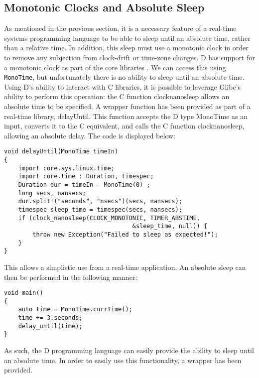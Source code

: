 \subsection{Monotonic Clocks and Absolute Sleep}
As mentioned in the previous section, it is a necessary feature of a real-time 
systems programming language to be able to sleep until an absolute time, rather 
than a relative time. In addition, this sleep must use a monotonic clock in order 
to remove any subjection from clock-drift or time-zone changes. D has support 
for a monotonic clock as part of the core libraries 
\cite{dlang-core-time}. We can access this using 
\texttt{MonoTime}, but unfortunately there is no ability to sleep until an 
absolute time. Using D's ability to interact with C libraries, it is possible 
to leverage Glibc's ability to perform this operation: the C function 
clock\textunderscore{}nanosleep allows an absolute time to be specified.
\cite{clock-nanosleep}
A wrapper function has been provided as part of a real-time library, delayUntil. 
This function accepts the D type MonoTime as an input, converts it to the C 
equivalent, and calls the C function clock\textunderscore{}nanosleep, allowing an absolute delay.
The code is displayed below: 
\begin{lstlisting}
void delayUntil(MonoTime timeIn)
{
    import core.sys.linux.time; 
    import core.time : Duration, timespec; 
    Duration dur = timeIn - MonoTime(0) ;
    long secs, nansecs; 
    dur.split!("seconds", "nsecs")(secs, nansecs); 
    timespec sleep_time = timespec(secs, nansecs); 
    if (clock_nanosleep(CLOCK_MONOTONIC, TIMER_ABSTIME, 
                                    &sleep_time, null)) {
        throw new Exception("Failed to sleep as expected!"); 
    }
}
\end{lstlisting}
This allows a simplistic use from a real-time application. An absolute sleep can 
then be performed in the following manner: 
\begin{lstlisting}
void main()
{
    auto time = MonoTime.currTime(); 
    time += 3.seconds; 
    delay_until(time);
}
\end{lstlisting}
As such, the D programming language can easily provide the ability to sleep 
until an absolute time. In order to easily use this functionality, a 
wrapper has been provided.

